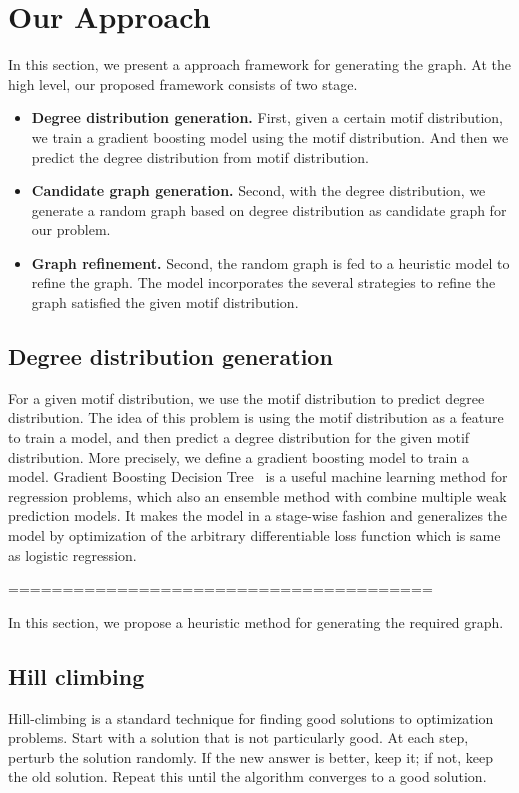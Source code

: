 \section{Our Approach}
\label{sec:approach}

In this section, we present a approach framework for generating the graph. At the high level, our proposed framework consists of two stage.
\begin{itemize}
    \item {\bf Degree distribution generation.} First, given a certain motif distribution, we train a gradient boosting model using the motif distribution. And then we predict the degree distribution from motif distribution.
    \item {\bf Candidate graph generation.} Second, with the degree distribution, we generate a random graph based on degree distribution as candidate graph for our problem.
    \item {\bf Graph refinement.} Second, the random graph is fed to a heuristic model to refine the graph. The model incorporates the several strategies to refine the graph satisfied the given motif distribution.
\end{itemize}

\subsection{Degree distribution generation} 

For a given motif distribution, we use the motif distribution to predict degree distribution. The idea of this problem is using the motif distribution as a feature to train a model, and then predict a degree distribution for the given motif distribution. More precisely, we define a gradient boosting model to train a model. Gradient Boosting Decision Tree~\cite{friedman2002stochastic} is a useful machine learning method for regression problems, which also an ensemble method with combine multiple weak prediction models. It makes the model in a stage-wise fashion and generalizes the model by optimization of the arbitrary differentiable loss function which is same as logistic regression. 


=======================================

In this section, we propose a heuristic method for generating the required
graph.

\subsection{Hill climbing}
Hill-climbing is a standard technique for finding good solutions to optimization problems.  Start with a solution that is not particularly good.  At each step, perturb the solution randomly.  If the new answer is better, keep it; if not, keep the old solution.  Repeat this until the algorithm converges to a good solution.

